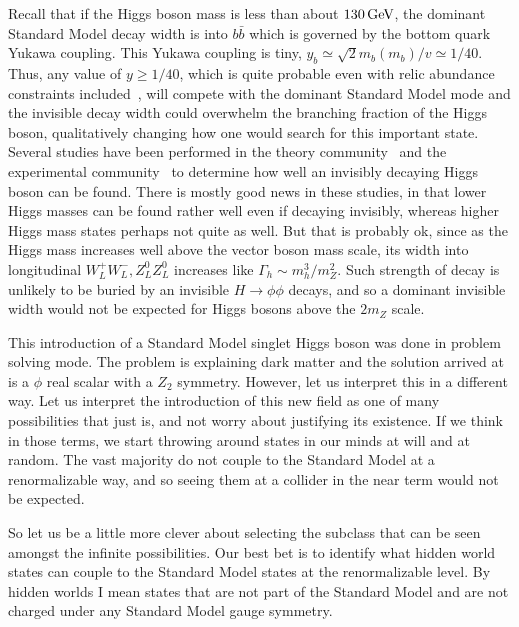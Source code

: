 \documentclass[12pt]{article}
\def\gev{\, {\rm GeV}}
\begin{document}
Recall that if the Higgs boson mass is less than about $130\gev$, the dominant Standard Model decay width is into $b\bar b$ which is governed by the bottom quark Yukawa coupling. This Yukawa coupling is tiny, $y_b\simeq \sqrt{2}m_b(m_b)/v\simeq 1/40$.  Thus, any value of $y\geq 1/40$, which is quite probable even with relic abundance constraints included~\cite{Burgess:2000yq}, will compete with the dominant Standard Model mode and the invisible decay width could overwhelm the branching fraction of the Higgs boson, qualitatively changing how one would search for this important state.  Several studies have been performed in the theory 
community~\cite{Joshipura:1992ua,Choudhury:1993hv,Gunion:1993jf,Frederiksen:1994me,Binoth:1996au,Martin:1999qf,Godbole:2003it,Davoudiasl:2004aj}
 and the experimental community~\cite{Aad:2009wy} to determine how well an invisibly decaying Higgs boson can be found. There is mostly good news in these studies, in that lower Higgs masses can be found rather well even if decaying invisibly, whereas higher Higgs mass states perhaps not quite as well. But that is probably ok, since as the Higgs mass increases well above the vector boson mass scale, its width into longitudinal $W_L^+W_L^-,Z^0_LZ_L^0$ increases like $\Gamma_h\sim m_h^3/m_Z^2$.  Such strength of decay is unlikely to be buried by an invisible $H\to \phi\phi$ decays, and so a dominant invisible width would not be expected for Higgs bosons above the $2m_Z$ scale.

This introduction of a Standard Model singlet Higgs boson was done in problem solving mode. The problem is explaining dark matter and the solution arrived at is a $\phi$ real scalar with a $Z_2$ symmetry. However, let us interpret this in a different way. Let us interpret the introduction of this new field as one of many possibilities that just is, and not worry about justifying its existence.  If we think in those terms, we start throwing around states in our minds at will and at random. The vast majority do not couple to the Standard Model at a renormalizable way, and so seeing them at a collider in the near term would not be expected.

So let us be a little more clever about selecting the subclass that can be seen amongst the infinite possibilities.  Our best bet is to identify what hidden world states can couple to the Standard Model states at the renormalizable level.  By hidden worlds I mean states that are not part of the Standard Model and are not charged under any Standard Model gauge symmetry. 
\end{document}
